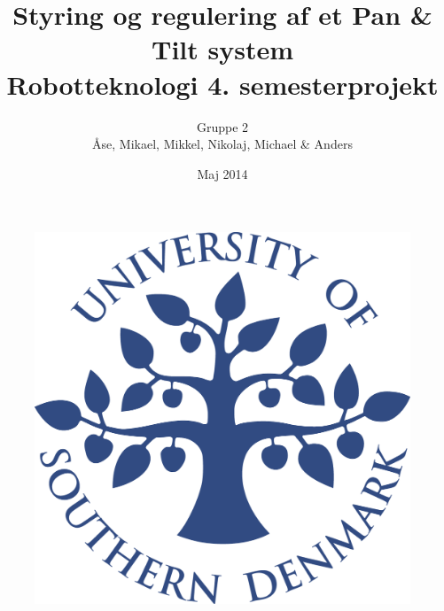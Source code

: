 \title{Styring og regulering af et Pan \& Tilt system \\Robotteknologi 4. semesterprojekt}
\author{Gruppe 2 \\ Åse, Mikael, Mikkel, Nikolaj, Michael \& Anders}
\date{Maj 2014}
\begin{figure}
\centering
\includegraphics[width=1\textwidth]{graphics/forside.png}
\end{figure}
\maketitle


